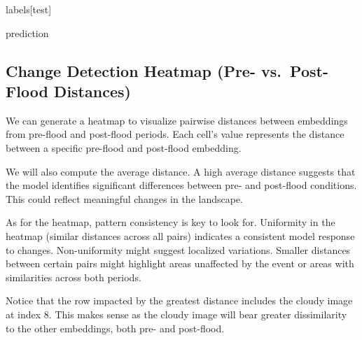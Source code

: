 \documentclass[
  letterpaper,
  DIV=11,
  numbers=noendperiod]{scrreprt}
\newenvironment{Shaded}{\begin{snugshade}}{\end{snugshade}}
\newcommand{\NormalTok}[1]{\textcolor[rgb]{0.00,0.23,0.31}{#1}}
\begin{document}
\begin{Shaded}
\begin{Highlighting}[]
\NormalTok{labels[test]}
\end{Highlighting}
\end{Shaded}

\begin{Shaded}
\begin{Highlighting}[]
\NormalTok{prediction}
\end{Highlighting}
\end{Shaded}

\subsection{Change Detection Heatmap (Pre- vs.~Post-Flood
Distances)}\label{change-detection-heatmap-pre--vs.-post-flood-distances}

We can generate a heatmap to visualize pairwise distances between
embeddings from pre-flood and post-flood periods. Each cell's value
represents the distance between a specific pre-flood and post-flood
embedding.

We will also compute the average distance. A high average distance
suggests that the model identifies significant differences between pre-
and post-flood conditions. This could reflect meaningful changes in the
landscape.

As for the heatmap, pattern consistency is key to look for. Uniformity
in the heatmap (similar distances across all pairs) indicates a
consistent model response to changes. Non-uniformity might suggest
localized variations. Smaller distances between certain pairs might
highlight areas unaffected by the event or areas with similarities
across both periods.

Notice that the row impacted by the greatest distance includes the
cloudy image at index 8. This makes sense as the cloudy image will bear
greater dissimilarity to the other embeddings, both pre- and post-flood.
\end{document}
